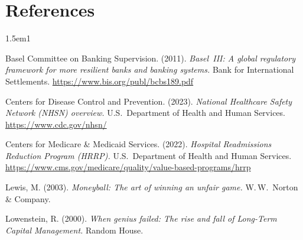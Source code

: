 \documentclass[11pt,openany]{book}
\begin{document}
\section*{References}
\begingroup
\sloppy

\begin{hangparas}{1.5em}{1}

Basel Committee on Banking Supervision. (2011). \emph{Basel~III: A global
regulatory framework for more resilient banks and banking systems.} Bank for
International Settlements. \url{https://www.bis.org/publ/bcbs189.pdf}

Centers for Disease Control and Prevention. (2023). \emph{National Healthcare
Safety Network (NHSN) overview.} U.S.\ Department of Health and Human
Services. \url{https://www.cdc.gov/nhsn/}

Centers for Medicare \& Medicaid Services. (2022). \emph{Hospital Readmissions
Reduction Program (HRRP).} U.S.\ Department of Health and Human Services.
\url{https://www.cms.gov/medicare/quality/value-based-programs/hrrp}

Lewis, M. (2003). \emph{Moneyball: The art of winning an unfair game.}
W.\,W.\ Norton \& Company.

Lowenstein, R. (2000). \emph{When genius failed: The rise and fall of
Long-Term Capital Management.} Random House.

\end{hangparas}

\endgroup
\end{document}

